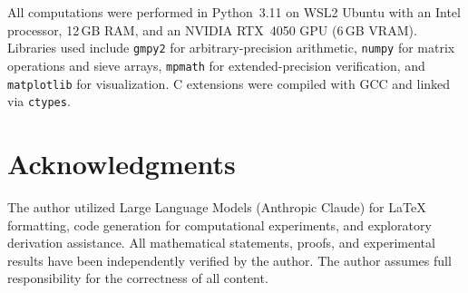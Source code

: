 \documentclass[12pt]{amsart}
\theoremstyle{definition}
\theoremstyle{remark}
\begin{document}
All computations were performed in Python~3.11 on WSL2 Ubuntu with an
Intel processor, 12\,GB RAM, and an NVIDIA RTX~4050 GPU (6\,GB VRAM).
Libraries used include \texttt{gmpy2} for arbitrary-precision arithmetic,
\texttt{numpy} for matrix operations and sieve arrays, \texttt{mpmath} for
extended-precision verification, and \texttt{matplotlib} for visualization.
C extensions were compiled with GCC and linked via \texttt{ctypes}.


\section*{Acknowledgments}
The author utilized Large Language Models (Anthropic Claude) for \LaTeX{}
formatting, code generation for computational experiments, and exploratory
derivation assistance. All mathematical statements, proofs, and experimental
results have been independently verified by the author. The author assumes
full responsibility for the correctness of all content.

\end{document}
